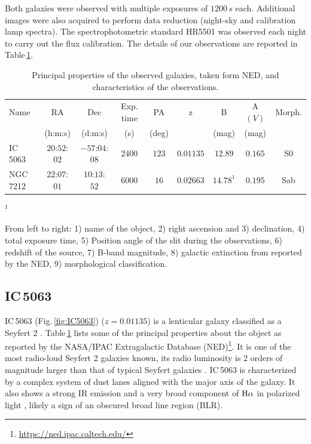 \documentclass[../thesis.tex]{subfiles}
\begin{document}
Both galaxies were observed with multiple exposures of $1200\,\si{s}$ each.
Additional images were also acquired to perform data reduction (night-sky and calibration lamp spectra).
The spectrophotometric standard HR5501 was observed each night to carry out the flux calibration.
The details of our observations are reported in Table\,\ref{tab:obs}. 


\begin{table}
\caption[]{Principal properties of the observed galaxies, taken form NED, and characteristics of the observations.}
\label{tab:obs}
\centering
\footnotesize
\begin{threeparttable}
\begin{tabular}{lcccccccc}
\hline
Name&RA&Dec& Exp. time & PA & z& B & A$(V)$& Morph.\\
&(h:m:s)&(d:m:s)& (s)& (deg)& & (mag)&(mag)&\\
\hline
IC\,5063& $20$:$52$:$02$&$-57$:$04$:$08$&$2400$&$123$&$0.01135$&$12.89$ &$0.165$&S0\\
NGC\,7212&$22$:$07$:$01$&$10$:$13$:$52$&$6000$&$16$&$0.02663$& $14.78^1$& $0.195$&Sab\\
\hline
\end{tabular}
\small
\begin{tablenotes}
\item $^1$\cite{Munoz07}
\item From left to right: 1) name of the object, 2) right ascension and 3) declination, 4) total exposure time, 5) Position angle of the slit during the observations, 6) redshift of the source, 7) B-band magnitude, 8) galactic extinction from \citet{Schlafly11} reported by the NED, 9) morphological classification.
\end{tablenotes}
\end{threeparttable}
\normalsize
\end{table}


\subsection{IC\,5063}
\label{sec:IC5063}




IC\,5063 (Fig.\,\ref{fig:IC5063}) ($z=0.01135$) is a lenticular galaxy classified as a Seyfert 2 \citep{Morganti07}.
Table\,\ref{tab:obs} lists some of the principal properties about the object as reported by the NASA/IPAC Extragalactic Database (NED)\footnote{\url{https://ned.ipac.caltech.edu/}}.
It is one of the most radio-loud Seyfert 2 galaxies known, its radio luminosity is 2 orders of magnitude larger than that of typical Seyfert galaxies \citep{Morganti98}.
IC\,5063 is characterized by a complex system of dust lanes aligned with the major axis of the galaxy.
It also shows a strong IR emission \citep{Hough87} and a very broad component of $\rm H\alpha$ in polarized light \citep{Inglis93}, likely a sign of an obscured broad line region (BLR).
\end{document}
